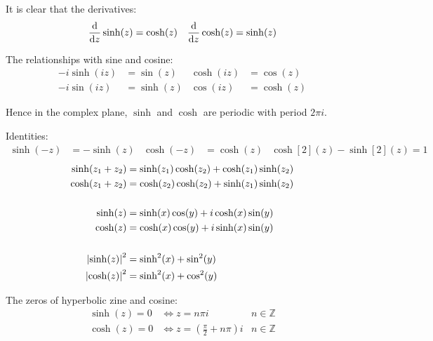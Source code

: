 \documentclass[12pt, english]{book}
\begin{document}
	It is clear that the derivatives: 
	\begin{align*}
		\dv{z} \sinh(z) &= \cosh(z) & \dv{z} \cosh(z) = \sinh(z)
	\end{align*}
	
	The relationships with sine and cosine:
	\begin{align*}
		-i\sinh(iz) &= \sin(z) & \cosh(iz) &= \cos(z) \\
		-i\sin(iz) &= \sinh(z) & \cos(iz) &= \cosh(z)
	\end{align*}
	
	Hence in the complex plane, \(\sinh\) and \(\cosh\) are periodic with period \(2\pi i\).
	
	Identities: 
	\begin{align*}
		\sinh(-z) &= -\sinh(z) & \cosh(-z) &= \cosh(z) & \cosh[2](z) - \sinh[2](z) = 1 
	\end{align*}
	\begin{align*}
		\sinh(z_1 + z_2) &= \sinh(z_1) \cosh(z_2) + \cosh(z_1) \sinh(z_2) \\
		\cosh(z_1 + z_2) &= \cosh(z_2)\cosh(z_2) + \sinh(z_1)\sinh(z_2) \\
		\\
		\sinh(z) &= \sinh(x) \cos(y) + i \cosh(x) \sin(y) \\
		\cosh(z) &= \cosh(x) \cos(y) + i \sinh(x) \sin(y) \\
		\\
		\abs{\sinh(z)}^2 &= \sinh[2](x) + \sin[2](y) \\
		\abs{\cosh(z)}^2 &= \sinh[2](x) + \cos[2](y)
	\end{align*}
	
	\begin{theorem}
		\label{Zeros of Hyperbolic Sine and Cosine Theorem - Complex}
		The zeros of hyperbolic zine and cosine:
		\begin{align*}
			\sinh(z) = 0 &\iff z = n \pi i & n \in \mathbb{Z} \\
			\cosh(z) = 0 &\iff z = \left(\frac{\pi}{2} + n\pi\right)i & n \in \mathbb{Z}
		\end{align*}
	\end{theorem}
\end{document}
